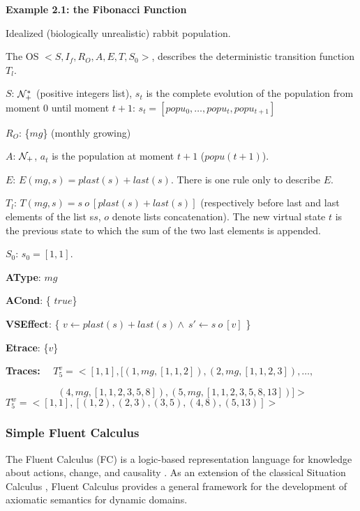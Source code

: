 \vspace{5mm}
{\bf Example 2.1: the Fibonacci Function}
\label{ex:fibo}

Idealized (biologically unrealistic) rabbit population.

\vspace{2mm}
The OS $< S, I_f, R_O, A, E, T, S_0 >$, describes the deterministic transition function $T_l$.

\vspace{2mm}
$S$: ${\cal N}_+^*$ (positive integers list), $s_t$ is the complete evolution of the population from moment $0$ until moment $t+1$: $s_t = [popu_0,\ldots, popu_t, popu_{t+1}]$ 

$R_O$: \{$mg$\} (monthly growing)  

$A$: ${\cal N}_+$, $a_t$ is the population at moment $t+1$ ($popu(t+1)$).

$E$: $E(mg,s) = plast(s)+last(s)$. There is one rule only to describe $E$.

$T_l$: $T(mg,s) = s \ o \ [plast(s)+last(s)]$ (respectively before last and last elements of the list s$s$, $o$ denote lists concatenation). The new virtual state $t$ is the previous state to which the sum of the two last elements is appended.


$S_0$: $s_0 = [1,1]$.



\vspace{1mm}
{\bf AType}: $mg$

{\bf ACond}: \{ $true$\}

{\bf VSEffect}:  \{ $v \leftarrow plast(s)+last(s) \wedge \ s' \leftarrow s\  o \  [v]$ \}

{\bf Etrace}:  \{$v$\} 

\vspace{4mm}
{\bf Traces:}
\ \ 
\newline $T^v_5 = <[1,1],[(1,mg,[1,1,2]), (2,mg,[1,1,2,3]), \ldots,$

$ \ \ \ \ \ \ \ \ \ \ \ \ \ \ \ \ \ \ \ \ \ \ \ \  (4,mg,[1,1,2,3,5,8]),(5,mg,[1,1,2,3,5,8,13])]>$
\newline $T^w_5 = <[1,1],[(1,2),(2,3),(3,5),(4,8),(5,13)]> $



\subsubsection{Simple Fluent Calculus}\label{sec:simplefluentcalculus}
\label{FC}


The Fluent Calculus (FC) is a logic-based representation language
for knowledge about actions, change, and causality \cite{thielscher1999situation}. As an
extension of the classical Situation Calculus \cite{reiter1991frame}, Fluent
Calculus provides a general framework for the development of axiomatic semantics
for dynamic domains.

